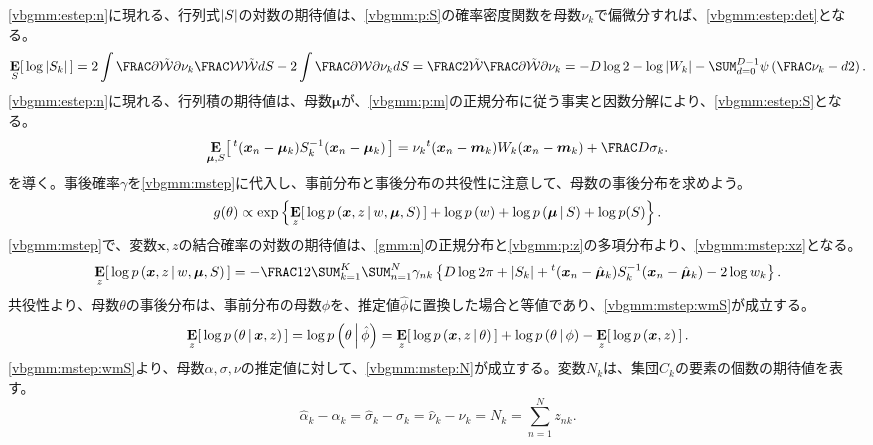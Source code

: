 \documentclass[10pt,a4paper]{book}
\begin{document}
%
\eqref{vbgmm:estep:n}に現れる、行列式$\abs{S}$の対数の期待値は、\eqref{vbgmm:p:S}の確率密度関数を母数$\nu_k$で偏微分すれば、\eqref{vbgmm:estep:det}となる。
%
\begin{equation}
\label{eq:vbgmm:estep:det}
\E[S]{\log \abs{S_k}} =
2 \int \pdiff{\Wt}{\nu_k}\frac{\Wp}{\Wt} dS - 2 \int \pdiff{\Wp}{\nu_k} dS =
\frac{2}{\Wt} \pdiff{\Wt}{\nu_k} =
- D\log 2 - \log\abs{W_k} - \sum_{d=0}^{D-1} \Pd{\frac{\nu_k-d}{2}}.
\end{equation}
%
\eqref{vbgmm:estep:n}に現れる、行列積の期待値は、母数$\bm{\mu}$が、\eqref{vbgmm:p:m}の正規分布に従う事実と因数分解により、\eqref{vbgmm:estep:S}となる。
%
\begin{equation}
\label{eq:vbgmm:estep:S}
\E[\bm{\mu},S]{\trans{(\bm{x}_n - \bm{\mu}_k)} S_k^{-1} (\bm{x}_n - \bm{\mu}_k)} =
\nu_k \trans{(\bm{x}_n - \bm{m}_k)} W_k (\bm{x}_n - \bm{m}_k) + \frac{D}{\sigma_k}.
\end{equation}
%
\Mstep{}を導く。事後確率$\gamma$を\eqref{vbgmm:mstep}に代入し、事前分布と事後分布の共役性に注意して、母数の事後分布を求めよう。
%
\begin{equation}
\label{eq:vbgmm:mstep}
g(\theta) \propto \exp\seq{\E[z]{\log \prob{\bm{x},z}[w,\bm{\mu},S]} + \log \prob{w) + \log \prob{\bm{\mu}}[S] + \log p(S}}.
\end{equation}
%
\eqref{vbgmm:mstep}で、変数$\bm{x},z$の結合確率の対数の期待値は、\eqref{gmm:n}の正規分布と\eqref{vbgmm:p:z}の多項分布より、\eqref{vbgmm:mstep:xz}となる。
%
\begin{equation}
\label{eq:vbgmm:mstep:xz}
\E[z]{\log \prob{\bm{x},z}[w,\bm{\mu},S]} =
- \frac{1}{2} \sum_{k=1}^K \sum_{n=1}^N \gamma_{nk}
\seq{D \log 2\pi + \abs{S_k} + \trans{(\bm{x}_n-\hat{\bm{\mu}}_k)} S_k^{-1} (\bm{x}_n-\hat{\bm{\mu}}_k) - 2 \log w_k}.
\end{equation}
%
共役性より、母数$\theta$の事後分布は、事前分布の母数$\phi$を、推定値$\hat{\phi}$に置換した場合と等値であり、\eqref{vbgmm:mstep:wmS}が成立する。
%
\begin{equation}
\label{eq:vbgmm:mstep:wmS}
\E[z]{\log \prob{\theta}[\bm{x},z]} =
\log \prob{\theta}[\hat{\phi}] =
\E[z]{\log \prob{\bm{x},z}[\theta]} + \log \prob{\theta}[\phi] - \E[z]{\log \prob{\bm{x},z}}.
\end{equation}
%
\eqref{vbgmm:mstep:wmS}より、母数$\alpha,\sigma,\nu$の推定値に対して、\eqref{vbgmm:mstep:N}が成立する。変数$N_k$は、集団$C_k$の要素の個数の期待値を表す。
%
\begin{equation}
\label{eq:vbgmm:mstep:N}
\hat{\alpha}_k - \alpha_k = \hat{\sigma}_k - \sigma_k = \hat{\nu}_k - \nu_k = N_k = \sum_{n=1}^N z_{nk}.
\end{equation}
\end{document}
